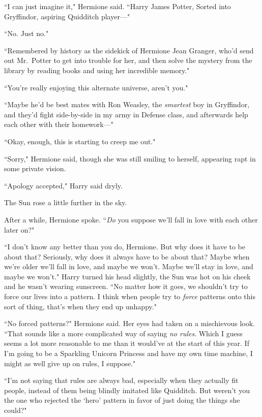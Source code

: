 ``I can just imagine it," Hermione said. ``Harry James Potter, Sorted into Gryffindor, aspiring Quidditch player---"

``No. Just no."

``Remembered by history as the sidekick of Hermione Jean Granger, who'd send out Mr.~Potter to get into trouble for her, and then solve the mystery from the library by reading books and using her incredible memory."

``You're really enjoying this alternate universe, aren't you."

``Maybe he'd be best mates with Ron Weasley, the \emph{smartest} boy in Gryffindor, and they'd fight side-by-side in my army in Defense class, and afterwards help each other with their homework---"

``Okay, enough, this is starting to creep me out."

``Sorry," Hermione said, though she was still smiling to herself, appearing rapt in some private vision.

``Apology accepted," Harry said dryly.

The Sun rose a little further in the sky.

After a while, Hermione spoke. ``\emph{Do} you suppose we'll fall in love with each other later on?"

``I don't know any better than you do, Hermione. But why does it have to be about that? Seriously, why does it always have to be about that? Maybe when we're older we'll fall in love, and maybe we won't. Maybe we'll stay in love, and maybe we won't." Harry turned his head slightly, the Sun was hot on his cheek and he wasn't wearing sunscreen. ``No matter how it goes, we shouldn't try to force our lives into a pattern. I think when people try to \emph{force} patterns onto this sort of thing, that's when they end up unhappy."

``No forced patterns?" Hermione said. Her eyes had taken on a mischievous look. ``That sounds like a more complicated way of saying \emph{no rules}. Which I guess seems a lot more reasonable to me than it would've at the start of this year. If I'm going to be a Sparkling Unicorn Princess and have my own time machine, I might as well give up on rules, I suppose."

``I'm not saying that rules are always bad, especially when they actually fit people, instead of them being blindly imitated like Quidditch. But weren't you the one who rejected the `hero' pattern in favor of just doing the things she could?"

